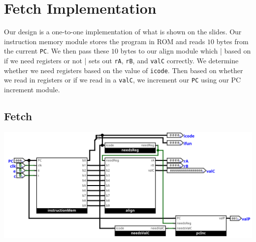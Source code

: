 \documentclass{article}
\begin{document}
\section{Fetch Implementation}
Our design is a one-to-one implementation of what is shown on the slides. Our instruction memory module stores the program in ROM and reads $10$ bytes from the current \verb+PC+. We then pass these $10$ bytes to our align module which | based on if we need registers or not | sets out \verb+rA+, \verb+rB+, and \verb+valC+ correctly. We determine whether we need registers based on the value of \verb+icode+. Then based on whether we read in registers or if we read in a  \verb+valC+, we increment our \verb+PC+ using our PC increment module.
\subsection{Fetch}
\begin{center}
    \includegraphics[scale=.7]{fetch.png}
\end{center}
\end{document}
